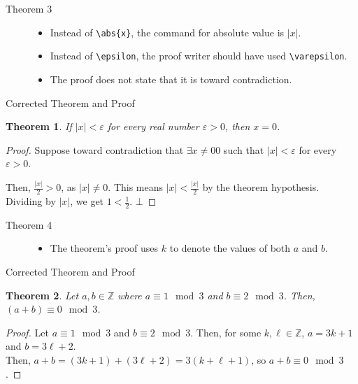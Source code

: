 \documentclass[10pt]{extarticle}
\newtheorem{theorem}{Theorem}
\newcommand{\Z}{\mathbb{Z}}
\begin{document}
  \begin{description}
    \item[Theorem 3] \hfill
      \begin{itemize}
        \item Instead of \verb|\abs{x}|, the command for absolute value is $|x|$.
        \item Instead of \verb|\epsilon|, the proof writer should have used \verb|\varepsilon|.
        \item The proof does not state that it is toward contradiction.
      \end{itemize}
  \end{description}
  \begin{problem}{Corrected Theorem and Proof}
    \begin{theorem}
      If $|x| < \varepsilon$ for every real number $\varepsilon > 0$, then $x = 0$.
    \end{theorem}
    \begin{proof}
      Suppose toward contradiction that $\exists x \neq 0 0$ such that $|x| < \varepsilon$ for every $\varepsilon > 0$.

      Then, $\frac{|x|}{2} > 0$, as $|x| \neq 0$. This means $|x| < \frac{|x|}{2}$ by the theorem hypothesis.\\

      Dividing by $|x|$, we get $1 < \frac{1}{2}$. $\bot$
    \end{proof}
  \end{problem}

  \begin{description}
    \item[Theorem 4]\hfill
      \begin{itemize}
        \item The theorem's proof uses $k$ to denote the values of both $a$ and $b$.
      \end{itemize}
  \end{description}
  \begin{problem}{Corrected Theorem and Proof}
    \begin{theorem}
      Let $a,b\in\Z$ where $a\equiv 1 \mod 3$ and $b\equiv 2 \mod 3$. Then, $(a+b)\equiv 0 \mod 3$.
    \end{theorem}
    \begin{proof}
      Let $a\equiv 1 \mod 3$ and $b\equiv 2 \mod 3$. Then, for some $k,\ell\in\Z$, $a = 3k+1$ and $b = 3\ell + 2$.\\

      Then, $a+b = (3k+1) + (3\ell + 2) = 3(k + \ell + 1)$, so $a + b \equiv 0 \mod 3$.
    \end{proof}
  \end{problem}
\end{document}
